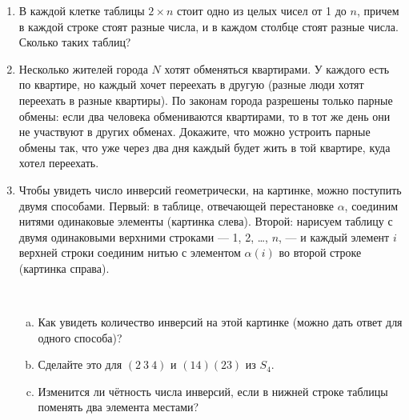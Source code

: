 \begin{enumerate}
\item  В каждой клетке таблицы $2\times n$ стоит одно из целых чисел от
1 до $n$, причем в каждой строке стоят разные числа, и в каждом
столбце стоят разные числа. Сколько таких таблиц?


\item  Несколько жителей города $N$ хотят обменяться квартирами. У
каждого есть по квартире, но каждый хочет переехать в другую
(разные люди хотят переехать в разные квартиры). По законам города
 разрешены только парные обмены: если два человека обмениваются
  квартирами, то в тот же день они не участвуют в других
обменах. Докажите, что можно устроить парные обмены так, что
уже через два дня каждый будет жить в той квартире, куда хотел
переехать.

\item 
 Чтобы увидеть число инверсий геометрически, на картинке, можно поступить двумя способами. Первый: в таблице, отвечающей перестановке $\alpha$, соединим нитями одинаковые элементы (картинка слева). Второй: нарисуем таблицу с двумя одинаковыми верхними строками --- 1, 2, \ldots, $n$, --- и каждый элемент $i$ верхней строки соединим нитью с элементом $\alpha(i)$ во второй строке (картинка справа).\\
\qquad
{}\\
\begin{enumerate}[a)]
\item Как увидеть количество инверсий на этой картинке  (можно дать ответ для одного способа)?
\item Сделайте это для $(2\ 3\ 4)$ и $(14)(23)$ из $S_4$.
\item Изменится ли чётность числа инверсий, если в нижней строке таблицы поменять два элемента местами?
\end{enumerate}




\end{enumerate}

